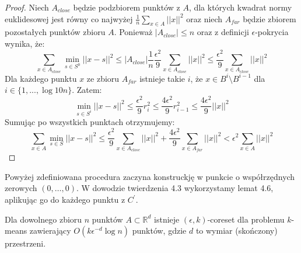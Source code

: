 \begin{proof}
    Niech $A_{close}$ będzie podzbiorem punktów z $A$, dla których kwadrat normy euklidesowej jest równy co najwyżej $\frac{1}{n}\sum_{x \in A}||x||^{2}$ oraz niech $A_{far}$ będzie zbiorem pozostałych punktów zbioru $A$.
    Ponieważ $|A_{close}| \leq n$ oraz z definicji $\epsilon$-pokrycia wynika, że:
    \begin{equation}
        \sum_{x\in A_{close}} \min_{s \in S^{0}} ||x - s||^{2} \leq |A_{close}|\frac{1}{n}\frac{\epsilon^{2}}{9}\sum_{x \in A_{close}}||x||^{2} \leq \frac{\epsilon^{2}}{9}\sum_{x \in A_{close}}||x||^{2}
    \end{equation}
    \noindent
    Dla każdego punktu $x$ ze zbioru $A_{far}$ istnieje takie $i$, że $x \in B^{i} \setminus B^{i-1}$ dla $i \in \{1, ..., \log10n \}$.
    Zatem:
    \begin{equation}
       \min_{s \in S^{i}} ||x - s||^{2} \leq \frac{\epsilon^{2}}{9} r_{i}^{2} \leq \frac{4\epsilon^{2}}{9} r_{i-1}^{2} \leq \frac{4\epsilon^{2}}{9} ||x||^2
    \end{equation}
    Sumując po wszystkich punktach otrzymujemy:
    \begin{equation}
        \sum_{x\in A} \min_{s \in S} ||x - s||^{2} \leq \frac{\epsilon^{2}}{9}\sum_{x \in A_{close}}||x||^{2} + \frac{4\epsilon^{2}}{9} \sum_{x \in A_{far}}||x||^2 < \epsilon^{2} \sum_{x \in A} ||x||^{2}
    \end{equation}
\end{proof}
\noindent
Powyżej zdefiniowana procedura zaczyna konstruckję w punkcie o współrzędnych zerowych $(0, \dots, 0)$.
W dowodzie twierdzenia 4.3 wykorzystamy lemat 4.6, aplikując go do każdego punktu z $C^{'}$.
\begin{thm}
    Dla dowolnego zbioru $n$ punktów $A \subset \mathbb{R}^d$ istnieje $(\epsilon, k)$-coreset dla problemu $k$-means zawierający $O(k\epsilon^{-d} \log n)$ punktów, gdzie $d$ to wymiar (skończony) przestrzeni.
\end{thm}
